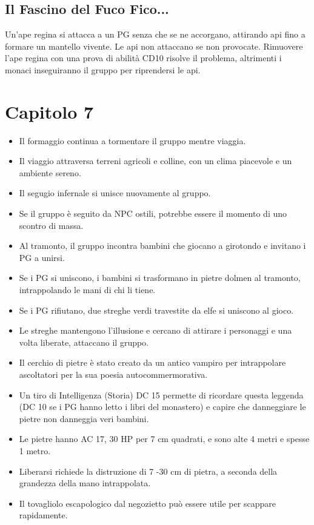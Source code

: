 \documentclass{article}
\begin{document}
\subsection{Il Fascino del Fuco Fico...}
Un'ape regina si attacca a un PG senza che se ne accorgano, attirando api fino a formare un mantello vivente. Le api non attaccano se non provocate. Rimuovere l'ape regina con una prova di abilità CD10 risolve il problema, altrimenti i monaci inseguiranno il gruppo per riprendersi le api.


\section{Capitolo 7}
\begin{itemize}
    \item Il formaggio continua a tormentare il gruppo mentre viaggia.
    \item Il viaggio attraversa terreni agricoli e colline, con un clima piacevole e un ambiente sereno.
    \item Il segugio infernale si unisce nuovamente al gruppo.
    \item Se il gruppo è seguito da NPC ostili, potrebbe essere il momento di uno scontro di massa.
    \item Al tramonto, il gruppo incontra bambini che giocano a girotondo e invitano i PG a unirsi.
    \item Se i PG si uniscono, i bambini si trasformano in pietre dolmen al tramonto, intrappolando le mani di chi li tiene.
    \item Se i PG rifiutano, due streghe verdi travestite da elfe si uniscono al gioco.
    \item Le streghe mantengono l'illusione e cercano di attirare i personaggi e una volta liberate, attaccano il gruppo.
    \item Il cerchio di pietre è stato creato da un antico vampiro per intrappolare ascoltatori per la sua poesia autocommermorativa.
    \item Un tiro di Intelligenza (Storia) DC 15 permette di ricordare questa leggenda (DC 10 se i PG hanno letto i libri del monastero) e capire che danneggiare le pietre non danneggia veri bambini.
    \item Le pietre hanno AC 17, 30 HP per 7 cm quadrati, e sono alte 4 metri e spesse 1 metro.
    \item Liberarsi richiede la distruzione di 7 -30 cm di pietra, a seconda della grandezza della mano intrappolata.
    \item Il tovagliolo escapologico dal negozietto può essere utile per scappare rapidamente.
\end{itemize}
\end{document}
